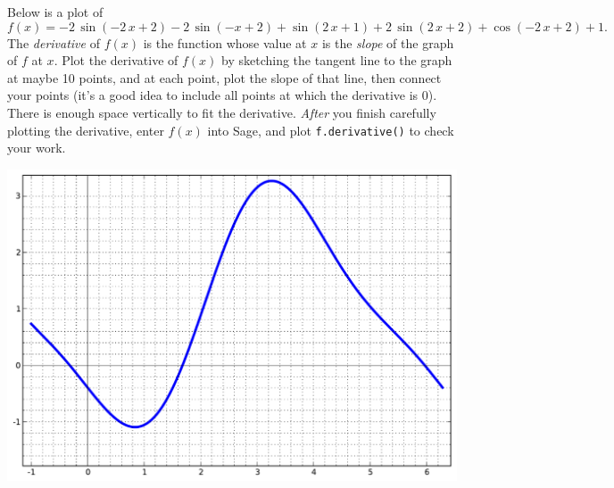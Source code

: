 Below is a plot of $$f(x)=-2 \, \sin\left(-2 \, x + 2\right) - 2 \, \sin\left(-x + 2\right) + \sin\left(2 \, x + 1\right) + 2 \, \sin\left(2 \, x + 2\right) + \cos\left(-2 \, x + 2\right) + 1.$$  The {\em \color{red}derivative} of $f(x)$ is the function whose value at $x$ is the {\em slope} of the graph of $f$ at $x$.  Plot the derivative of $f(x)$ by sketching the tangent line to the graph at maybe 10 points, and at each point, plot the slope of that line, then connect your points (it's a good idea to include all points at which the derivative is 0).  There is enough space vertically to fit the derivative.  {\em After} you finish carefully plotting the derivative, enter $f(x)$ into Sage, and plot {\color{blue}\verb|f.derivative()|} to check your work.
\begin{center}\includegraphics{functions/73.pdf}\end{center}\newpage

